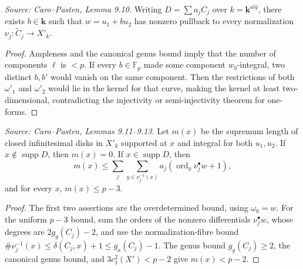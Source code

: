 \begin{lemma}
  \label{lem:cp_choice_w}
  \textit{Source: Caro--Pasten, Lemma 9.10.}
  Writing \(D=\sum a_jC_j\) over \(k=\mathbf k^{alg}\), there exists
  \(b\in\mathbf k\) such that \(w=u_1+bu_2\) has nonzero pullback to every
  normalization \(\nu_j:\widetilde C_j\to X'_k\).
\end{lemma}
\begin{proof}
  Ampleness and the canonical genus bound imply that the number of components
  \(\ell\) is \(<p\).  If every \(b\in\mathbb F_p\) made some component
  \(w_b\)-integral, two distinct \(b,b'\) would vanish on the same component.
  Then the restrictions of both \(\omega'_1\) and \(\omega'_2\) would lie in
  the kernel for that curve, making the kernel at least two-dimensional,
  contradicting the injectivity or semi-injectivity theorem for one-forms.
\end{proof}

\begin{lemma}
  \label{lem:cp_mx_bounds}
  \textit{Source: Caro--Pasten, Lemmas 9.11--9.13.}
  Let \(m(x)\) be the supremum length of closed infinitesimal disks in
  \(X'_k\) supported at \(x\) and integral for both \(u_1,u_2\).  If
  \(x\notin\operatorname{supp}D\), then \(m(x)=0\).  If \(x\in\operatorname{supp}D\),
  then
  \[
    m(x)\le \sum_j\sum_{y\in\nu_j^{-1}(x)}
      a_j(\operatorname{ord}_y\nu_j^\bullet w+1),
  \]
  and for every \(x\), \(m(x)\le p-3\).
\end{lemma}
\begin{proof}
  The first two assertions are the overdetermined bound, using
  \(\omega_0=w\).  For the uniform \(p-3\) bound, sum the orders of the
  nonzero differentials \(\nu_j^\bullet w\), whose degrees are
  \(2g_g(C_j)-2\), and use the normalization-fibre bound
  \(\#\nu_j^{-1}(x)\le\delta(C_j,x)+1\le g_a(C_j)-1\).  The genus bound
  \(g_g(C_j)\ge2\), the canonical genus bound, and
  \(3c_1^2(X')<p-2\) give \(m(x)<p-2\).
\end{proof}

